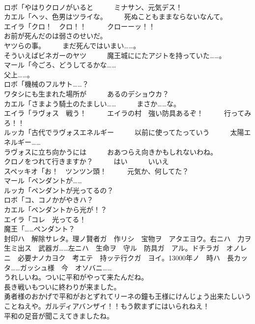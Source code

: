 \documentclass[8pt]{extreport}
\begin{document}
\begin{CJK}{UTF8}{min}
\\	ロボ「やはりクロノがいると　　　ミナサン、元気デス！	
\\	カエル「ヘッ、色男はツライな。　　　死ぬこともままならないなんて。	
\\	エイラ「クロ！　クロ！！　　　クローーッ！！	
\\	お前が死んだのは弱さのせいだ。	
\\	ヤツらの事。　　　まだ死んではいまい……。	
\\	そういえばビネガーのヤツ　　　魔王城ににたアジトを持っていた……。	
\\	マール「今ごろ、どうしてるかな……	
\\	父上……。	
\\	ロボ「機械のフルサト……？	
\\	ワタシにも生まれた場所が　　　あるのデショウカ？	
\\	カエル「さまよう騎土のたましい……　　　まさか……な。	
\\	エイラ「ラヴォス　戦う！　　　エイラの村　強い防具あるぞ！　　　行ってみろ！！	
\\	ルッカ「古代でラヴォスエネルギー　　　以前に使ってたっていう　　　太陽エネルギー……	
\\	ラヴォスに立ち向かうには　　　おあつらえ向きかもしれないわね。	
\\	クロノをつれて行きますか？　　　はい　　　いいえ	
\\	スペッキオ「お！　ツンツン頭！　　　元気か、何してた？	
\\	マール「ペンダントが……	
\\	ルッカ「ペンダントが光ってるの？	
\\	ロボ「コ、コノかがやきハ？	
\\	カエル「ペンダントから光が！？	
\\	エイラ「コレ　光ってる！	
\\	魔王「……ペンダント？	
\\	封印ハ　解除サレタ。理ノ賢者ガ　作リシ　宝物ヲ　アタエヨウ。右ニハ　力ヲ　生ミ出ス　武器ガ……左ニハ　生命ヲ　守ル　防具ガ　アル。ドチラガ　オノレニ　必要ナノカヨク　考エテ　持ッテ行クガ　ヨイ。13000年ノ　時ハ　長カッタ……ガッシュ様　今　オソバニ……	
\\	うれしいね。ついに平和がやって来たんだね。	
\\	長き戦いもついに終わりが来ました。	
\\	勇者様のおかげで平和がおとずれてリーネの鐘も王様にけんじょう出来たしいうことねえや。ガルディアバンザイ！！もう飮まずにはいられねえ！	
\\	平和の足音が聞こえてきましたね。	

\end{CJK}
\end{document}
